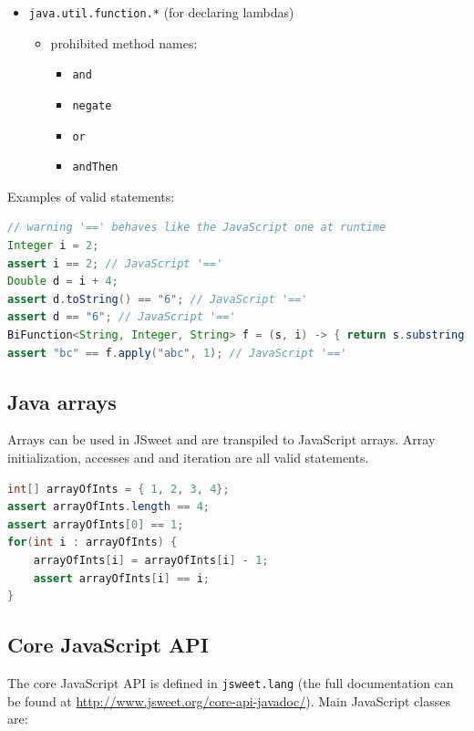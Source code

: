 \documentclass[a4paper]{report}
\begin{document}
\begin{itemize}
\begin{itemize}
	\end{itemize}
\item \texttt{java.util.function.*} (for declaring lambdas)
	\begin{itemize}
	\item prohibited method names: 
			\begin{itemize}
				\item \texttt{and}
				\item \texttt{negate} 
				\item \texttt{or}
				\item \texttt{andThen}
			\end{itemize}
	\end{itemize}
\end{itemize}

\noindent
Examples of valid statements:

\begin{lstlisting}[language=Java]
// warning '==' behaves like the JavaScript one at runtime
Integer i = 2;
assert i == 2; // JavaScript '=='
Double d = i + 4;
assert d.toString() == "6"; // JavaScript '=='
assert d == "6"; // JavaScript '=='
BiFunction<String, Integer, String> f = (s, i) -> { return s.substring(i); };
assert "bc" == f.apply("abc", 1); // JavaScript '=='
\end{lstlisting}

\subsection{Java arrays}

Arrays can be used in JSweet and are transpiled to JavaScript arrays. Array initialization, accesses and and iteration are all valid statements.

\begin{lstlisting}[language=Java]
int[] arrayOfInts = { 1, 2, 3, 4};
assert arrayOfInts.length == 4;  
assert arrayOfInts[0] == 1;
for(int i : arrayOfInts) {
	arrayOfInts[i] = arrayOfInts[i] - 1;
	assert arrayOfInts[i] == i;
}
\end{lstlisting}

\subsection{Core JavaScript API}

The core JavaScript API is defined in \texttt{jsweet.lang} (the full documentation can be found at \url{http://www.jsweet.org/core-api-javadoc/}). Main JavaScript classes are:
\end{document}
